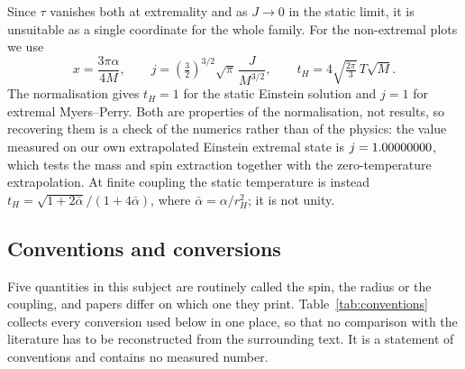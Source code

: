 \documentclass[11pt,a4paper]{article}
\begin{document}
Since $\tau$ vanishes both at extremality and as $J\to0$ in the static
limit, it is unsuitable as a single coordinate for the whole family.
For the non-extremal plots we use \cite{Kleihaus:2023zzs}
\begin{equation}
 x=\frac{3\pi\alpha}{4M},\qquad
 j=\left(\tfrac32\right)^{3/2}\sqrt\pi\,\frac J{M^{3/2}},\qquad
 t_H=4\sqrt{\tfrac{2\pi}{3}}\,T\sqrt M .
 \label{eq:massvars}
\end{equation}
The normalisation gives $t_H=1$ for the static Einstein solution and
$j=1$ for extremal Myers--Perry. Both are properties of the normalisation,
not results, so recovering them is a check of the numerics rather than of the
physics: the value measured on our own extrapolated Einstein extremal state is
$j=1.00000000$, which tests the mass and spin extraction together with the
zero-temperature extrapolation. At finite coupling the static temperature is instead
$t_H=\sqrt{1+2\bar\alpha}/(1+4\bar\alpha)$, where
$\bar\alpha=\alpha/r_H^2$; it is not unity.

\subsection{Conventions and conversions}
\label{sec:conventions}

Five quantities in this subject are routinely called the spin, the radius or
the coupling, and papers differ on which one they print.
Table~\ref{tab:conventions} collects every conversion used below in one place,
so that no comparison with the literature has to be reconstructed from the
surrounding text. It is a statement of conventions and contains no measured
number.
\end{document}
